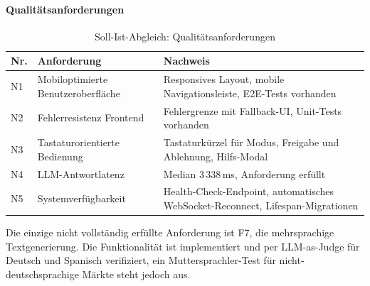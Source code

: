 \newpage
\paragraph{Qualitätsanforderungen}

\begin{longtable}[]{@{}
  >{\raggedright\arraybackslash}p{}
  >{\raggedright\arraybackslash}p{}
  >{\raggedright\arraybackslash}p{}@{}}
\caption{Soll-Ist-Abgleich: Qualitätsanforderungen}\label{tab:soll-ist-qualitaet}\\
\toprule\noalign{}
Nr. & Anforderung & Nachweis \\
\midrule\noalign{}
\endhead
\bottomrule\noalign{}
\endlastfoot
N1 & Mobiloptimierte Benutzeroberfläche & Responsives Layout, mobile Navigationsleiste, E2E-Tests vorhanden \\
N2 & Fehlerresistenz Frontend & Fehlergrenze mit Fallback-UI, Unit-Tests vorhanden \\
N3 & Tastaturorientierte Bedienung & Tastaturkürzel für Modus, Freigabe und Ablehnung, Hilfs-Modal \\
N4 & LLM-Antwortlatenz & Median 3\,338\,ms, Anforderung erfüllt \\
N5 & Systemverfügbarkeit & Health-Check-Endpoint, automatisches WebSocket-Reconnect, Lifespan-Migrationen \\
\end{longtable}

Die einzige nicht vollständig erfüllte Anforderung ist F7, die mehrsprachige Textgenerierung. Die Funktionalität ist implementiert und per LLM-as-Judge für Deutsch und Spanisch verifiziert, ein Muttersprachler-Test für nicht-deutschsprachige Märkte steht jedoch aus.

